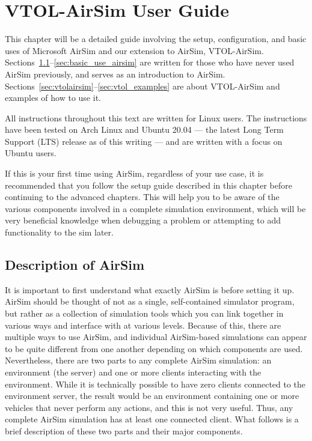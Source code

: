 
\chapter{VTOL-AirSim User Guide}\label{chp:userguide}

This chapter will be a detailed guide involving the setup, configuration, and basic uses of Microsoft AirSim and our extension to AirSim, VTOL-AirSim. Sections~\ref{sec:description_airsim}--\ref{sec:basic_use_airsim} are written for those who have never used AirSim previously, and serves as an introduction to AirSim. Sections~\ref{sec:vtolairsim}--\ref{sec:vtol_examples} are about VTOL-AirSim and examples of how to use it.

All instructions throughout this text are written for Linux users. The instructions have been tested on Arch Linux and Ubuntu 20.04 --- the latest Long Term Support (LTS) release as of this writing --- and are written with a focus on Ubuntu users.


If this is your first time using AirSim, regardless of your use case, it is recommended that you follow the setup guide described in this chapter before continuing to the advanced chapters. This will help you to be aware of the various components involved in a complete simulation environment, which will be very beneficial knowledge when debugging a problem or attempting to add functionality to the sim later.

\section{Description of AirSim}\label{sec:description_airsim}

It is important to first understand what exactly AirSim is before setting it up. AirSim should be thought of not as a single, self-contained simulator program, but rather as a collection of simulation tools which you can link together in various ways and interface with at various levels. Because of this, there are multiple ways to use AirSim, and individual AirSim-based simulations can appear to be quite different from one another depending on which components are used. Nevertheless, there are two parts to any complete AirSim simulation: an environment (the server) and one or more clients interacting with the environment. While it is technically possible to have zero clients connected to the environment server, the result would be an environment containing one or more vehicles that never perform any actions, and this is not very useful. Thus, any complete AirSim simulation has at least one connected client. What follows is a brief description of these two parts and their major components.

